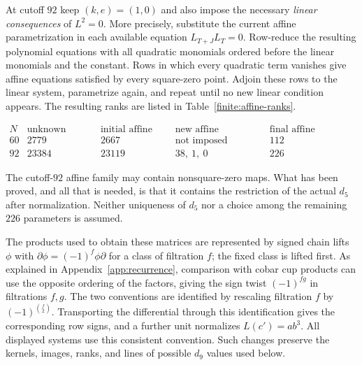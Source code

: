At cutoff $92$ keep $(k,e)=(1,0)$ and also impose the necessary
\emph{linear consequences} of $L^2=0$.  More precisely, substitute
the current affine parametrization in each available equation
$L_{T+J}L_T=0$.  Row-reduce the resulting polynomial equations with
all quadratic monomials ordered before the linear monomials and
the constant.  Rows in which every quadratic term vanishes give
affine equations satisfied by every square-zero point.  Adjoin
these rows to the linear system, parametrize again, and repeat until
no new linear condition appears.  The resulting ranks are listed in
Table~\ref{finite:affine-ranks}.

\begin{table}[htbp]
\centering\small
\(
\begin{array}{c|r|r|c|r}
 N&\text{unknown entries}&\text{initial affine rank}&
     \text{new affine constraints}&
     \text{final affine dimension}\\\hline
 60&2779&2667&\text{not imposed}&112\\
 92&23384&23119&38,\ 1,\ 0&226
\end{array}
\)
\caption{Necessary affine conditions on the normalized fifth differential.}
\label{finite:affine-ranks}
\end{table}

The cutoff-$92$ affine family may contain nonsquare-zero maps.  What
has been proved, and all that is needed, is that it contains the
restriction of the actual $d_5$ after normalization.  Neither
uniqueness of $d_5$ nor a choice among the remaining $226$ parameters
is assumed.

\begin{remark}\label{finite:signs}
The products used to obtain these matrices are represented by signed
chain lifts $\phi$ with
$\partial\phi=(-1)^f\phi\partial$ for a class of filtration $f$;
the fixed class is lifted first.  As explained in
Appendix~\ref{app:recurrence}, comparison with cobar cup products
can use the opposite ordering of the factors, giving the sign twist
$(-1)^{fg}$ in filtrations $f,g$.  The two conventions are identified by
rescaling filtration $f$ by $(-1)^{\binom f2}$.  Transporting the
differential through this identification gives the corresponding
row signs, and a further unit normalizes $L(c')=ab^3$.  All displayed
systems use this consistent convention.  Such changes preserve the
kernels, images, ranks, and lines of possible $d_9$ values used
below.
\end{remark}

